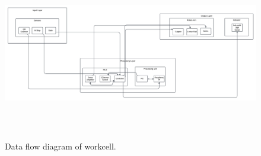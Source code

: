 

\begin{figure}[h!]
	\centering
 	\includegraphics[width=\textwidth, height=3in]{images/system_subystem.png}
 \caption{Data flow diagram of workcell.}
\end{figure}
